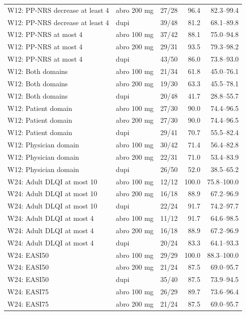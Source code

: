 \begin{longtable}{llrrr}
W12: PP-NRS decrease at least 4 & abro 200 mg & 27/28 & 96.4 & 82.3--99.4 \\
W12: PP-NRS decrease at least 4 & dupi & 39/48 & 81.2 & 68.1--89.8 \\
W12: PP-NRS at most 4 & abro 100 mg & 37/42 & 88.1 & 75.0--94.8 \\
W12: PP-NRS at most 4 & abro 200 mg & 29/31 & 93.5 & 79.3--98.2 \\
W12: PP-NRS at most 4 & dupi & 43/50 & 86.0 & 73.8--93.0 \\
W12: Both domains & abro 100 mg & 21/34 & 61.8 & 45.0--76.1 \\
W12: Both domains & abro 200 mg & 19/30 & 63.3 & 45.5--78.1 \\
W12: Both domains & dupi & 20/48 & 41.7 & 28.8--55.7 \\
W12: Patient domain & abro 100 mg & 27/30 & 90.0 & 74.4--96.5 \\
W12: Patient domain & abro 200 mg & 27/30 & 90.0 & 74.4--96.5 \\
W12: Patient domain & dupi & 29/41 & 70.7 & 55.5--82.4 \\
W12: Physician domain & abro 100 mg & 30/42 & 71.4 & 56.4--82.8 \\
W12: Physician domain & abro 200 mg & 22/31 & 71.0 & 53.4--83.9 \\
W12: Physician domain & dupi & 26/50 & 52.0 & 38.5--65.2 \\
W24: Adult DLQI at most 10 & abro 100 mg & 12/12 & 100.0 & 75.8--100.0 \\
W24: Adult DLQI at most 10 & abro 200 mg & 16/18 & 88.9 & 67.2--96.9 \\
W24: Adult DLQI at most 10 & dupi & 22/24 & 91.7 & 74.2--97.7 \\
W24: Adult DLQI at most 4 & abro 100 mg & 11/12 & 91.7 & 64.6--98.5 \\
W24: Adult DLQI at most 4 & abro 200 mg & 16/18 & 88.9 & 67.2--96.9 \\
W24: Adult DLQI at most 4 & dupi & 20/24 & 83.3 & 64.1--93.3 \\
W24: EASI50 & abro 100 mg & 29/29 & 100.0 & 88.3--100.0 \\
W24: EASI50 & abro 200 mg & 21/24 & 87.5 & 69.0--95.7 \\
W24: EASI50 & dupi & 35/40 & 87.5 & 73.9--94.5 \\
W24: EASI75 & abro 100 mg & 26/29 & 89.7 & 73.6--96.4 \\
W24: EASI75 & abro 200 mg & 21/24 & 87.5 & 69.0--95.7 \\

\end{longtable}
